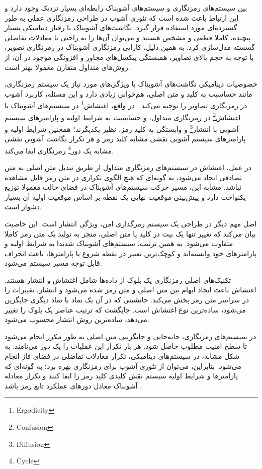 بین سیستم‌های رمزنگاری و سیستم‌های آشوبناک رابطه‌ای بسیار نزدیک وجود دارد و این ارتباط باعث شده است که تئوری آشوب در طراحی رمزنگاری عملی به طور گسترده‌ای مورد استفاده قرار گیرد. نگاشت‌های آشوبناک با رفتار دینامیکی بسیار پیچیده، کاملا قطعی و مشخص هستند و می‌توان آن‌ها را به راحتی با معادلات تفاضلی گسسته مدل‌سازی کرد. به همین دلیل، کارایی رمزنگاری آشوبناک در رمزنگاری تصویر، با توجه به حجم بالای تصاویر، همبستگی پیکسل‌های مجاور و افزونگی موجود در آن، از روش‌های متداول متقارن معمولا بهتر است\cite{ref36}.

خصوصیات دینامیکی نگاشت‌های آشوبناک با ویژگی‌های مورد نیاز یک سیستم رمزنگاری، مانند حساسیت به کلید و متن اصلی، هم‌خوانی زیادی دارد و این مسئله، کاربرد آشوب در رمزنگاری تصاویر را توجیه می‌کند \cite{ref19}. در واقع، اغتشاش\footnote{Ergodicity} در سیستم‌های آشوبناک با اغتشاش\footnote{Confusion} در رمزنگاری متداول، و حساسیت به شرایط اولیه و پارامترهای سیستم آشوبی با انتشار\footnote{Diffusion} و وابستگی به کلید رمز، نظیر یکدیگرند؛ همچنین شرایط اولیه و پارامترهای سیستم آشوبی نقشی مشابه کلید رمز و هر تکرار نگاشت آشوبی نقشی مشابه یک دور\footnote{Cycle} رمزنگاری ایفا می‌کند.

در عمل، اغتشاش در سیستم‌های رمزنگاری متداول از طریق تبدیل متن اصلی به متن تصادفی ایجاد می‌شود، به گونه‌ای که هیچ الگوی تکراری در متن رمز قابل مشاهده نباشد. مشابه این، مسیر حرکت سیستم‌های آشوبناک در فضای حالت معمولا توزیع یکنواخت دارد و پیش‌بینی موقعیت نهایی یک نقطه بر اساس موقعیت اولیه آن بسیار دشوار است\cite{ref23}.

اصل مهم دیگر در طراحی یک سیستم رمزگذاری امن، ویژگی انتشار است. این خاصیت بیان می‌کند که تغییر تنها یک بیت در کلید یا متن اصلی، منجر به تولید یک متن رمز کاملا متفاوت می‌شود. به همین ترتیب، سیستم‌های آشوبناک شدیدا به شرایط اولیه و پارامترهای خود وابسته‌اند و کوچک‌ترین تغییر در نقطه شروع یا پارامترها، باعث انحراف قابل توجه مسیر سیستم می‌شود\cite{ref23}.

تکنیک‌های اصلی رمزنگاری یک بلوک از داده‌ها شامل اغتشاش و انتشار هستند. اغتشاش باعث ایجاد ابهام بین متن اصلی و متن رمز شده می‌شود و انتشار، تغییرات را در سراسر متن رمز پخش می‌کند. جانشینی که در آن یک نماد با نماد دیگری جایگزین می‌شود، ساده‌ترین نوع اغتشاش است. جایگشت که ترتیب عناصر یک بلوک را تغییر می‌دهد، ساده‌ترین روش انتشار محسوب می‌شود.

در سیستم‌های رمزنگاری، جابه‌جایی و جایگزینی متن اصلی به طور مکرر انجام می‌شود تا سطح امنیت مطلوب حاصل شود. هر بار تکرار این عملیات را یک دور می‌نامند. به شکل مشابه، در سیستم‌های دینامیکی، تکرار معادلات تفاضلی در فضای فاز انجام می‌شود. بنابراین، می‌توان از تئوری آشوب برای رمزنگاری بهره برد؛ به گونه‌ای که پارامترها و شرایط اولیه سیستم نقش کلیدی کلید رمز را ایفا کنند و تکرار معادله آشوبناک معادل دورهای عملکرد تابع رمز باشد \cite{ref33}.

